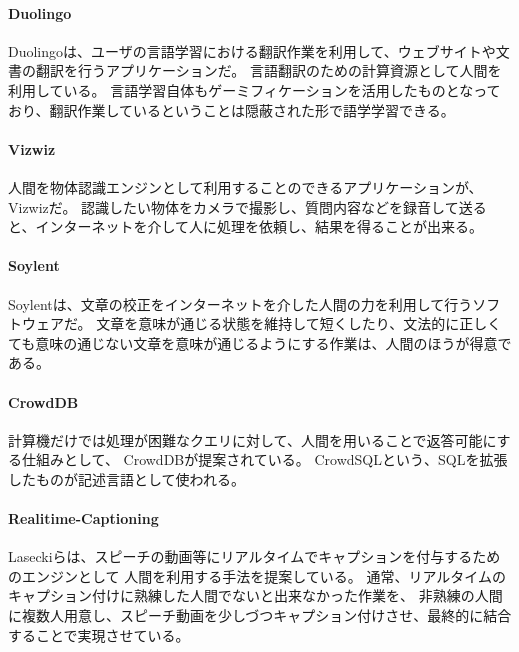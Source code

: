 \paragraph{Duolingo}\label{duolingo}

\mbox{}

Duolingo\cite{duolingo}は、ユーザの言語学習における翻訳作業を利用して、ウェブサイトや文書の翻訳を行うアプリケーションだ。
言語翻訳のための計算資源として人間を利用している。
言語学習自体もゲーミフィケーションを活用したものとなっており、翻訳作業しているということは隠蔽された形で語学学習できる。

\paragraph{Vizwiz}\label{vizwiz}

\mbox{}

人間を物体認識エンジンとして利用することのできるアプリケーションが、Vizwiz\cite{vizwiz}だ。
認識したい物体をカメラで撮影し、質問内容などを録音して送ると、インターネットを介して人に処理を依頼し、結果を得ることが出来る。

\paragraph{Soylent}\label{soylent}

\mbox{}

Soylent\cite{soylent}は、文章の校正をインターネットを介した人間の力を利用して行うソフトウェアだ。
文章を意味が通じる状態を維持して短くしたり、文法的に正しくても意味の通じない文章を意味が通じるようにする作業は、人間のほうが得意である。

\paragraph{CrowdDB}\label{crowddb}

\mbox{}

計算機だけでは処理が困難なクエリに対して、人間を用いることで返答可能にする仕組みとして、
CrowdDB\cite{crowddb}が提案されている。
CrowdSQLという、SQLを拡張したものが記述言語として使われる。

\paragraph{Realitime-Captioning}\label{realitime-captioning}

\mbox{}

Laseckiら\cite{realtime-captioning}は、スピーチの動画等にリアルタイムでキャプションを付与するためのエンジンとして
人間を利用する手法を提案している。
通常、リアルタイムのキャプション付けに熟練した人間でないと出来なかった作業を、
非熟練の人間に複数人用意し、スピーチ動画を少しづつキャプション付けさせ、最終的に結合することで実現させている。

